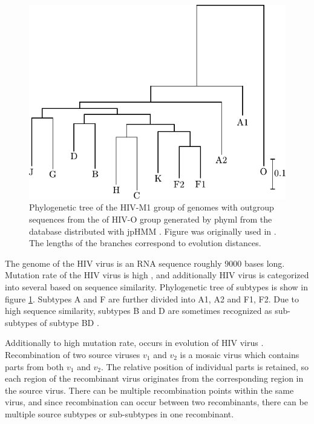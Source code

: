 \begin{figure}
\begin{center}
\includegraphics{../figures/hiv_M1strom}
\end{center}
\caption[Phylogenetic tree of the HIV-M1 group]{Phylogenetic tree of the HIV-M1
group of genomes with outgroup sequences from the of HIV-O group generated by phyml \cite{Guidon2003}
from the database distributed with jpHMM \cite{Schultz2006}. Figure was originally
used in \cite{Nanasi2010mgr}. The lengths of the branches correspond to 
evolution distances.  }\label{app:figure:phil}
\end{figure}

The genome of the HIV virus is an RNA sequence roughly $9000$ bases long.
Mutation rate of the HIV virus is high \cite{Schultz2006}, and additionally HIV virus is
categorized into several  \cite{Robertson2000} based on sequence
similarity. Phylogenetic tree of subtypes is show in figure
\ref{app:figure:phil}.  Subtypes A and F are further divided into
 A1, A2 and F1, F2.  Due to high sequence similarity,
subtypes B and D are sometimes recognized as sub-subtypes of subtype BD
\cite{Robertson2000}.

Additionally to high mutation rate,  occurs in
evolution of HIV virus \cite{Robertson2000}. Recombination of two source viruses $v_1$
and $v_2$ is a mosaic virus which contains parts from both $v_1$ and $v_2$.  The
relative position of individual parts is retained, so each region of the
recombinant virus originates from the corresponding region in the source virus.
There can be multiple recombination points within the same virus, and since
recombination can occur between two recombinants, there can be multiple source
subtypes or sub-subtypes in one recombinant. 

